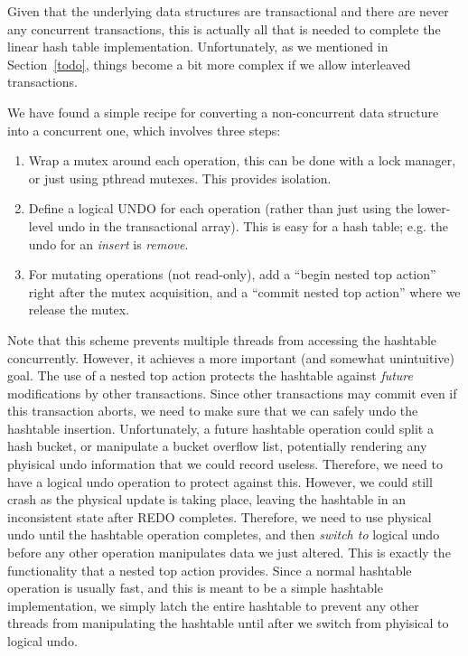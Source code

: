 \documentclass[letterpaper,twocolumn,english]{article}
\begin{document}
Given that the underlying data structures are transactional and there
are never any concurrent transactions, this is actually all that is
needed to complete the linear hash table implementation.
Unfortunately, as we mentioned in Section~\ref{todo}, things become a
bit more complex if we allow interleaved transactions. 

We have found a simple recipe for converting a non-concurrent data structure into a concurrent one, which involves three steps:
\begin{enumerate}
\item Wrap a mutex around each operation, this can be done with a lock
  manager, or just using pthread mutexes.  This provides isolation.
\item Define a logical UNDO for each operation (rather than just using
  the lower-level undo in the transactional array).  This is easy for a
  hash table; e.g. the undo for an {\em insert} is {\em remove}.
\item For mutating operations (not read-only), add a ``begin nested
  top action'' right after the mutex acquisition, and a ``commit
  nested top action'' where we release the mutex.
\end{enumerate}

Note that this scheme prevents multiple threads from accessing the
hashtable concurrently.  However, it achieves a more important (and
somewhat unintuitive) goal.  The use of a nested top action protects
the hashtable against {\em future} modifications by other
transactions.  Since other transactions may commit even if this
transaction aborts, we need to make sure that we can safely undo the
hashtable insertion.  Unfortunately, a future hashtable operation
could split a hash bucket, or manipulate a bucket overflow list,
potentially rendering any phyisical undo information that we could
record useless.  Therefore, we need to have a logical undo operation
to protect against this.  However, we could still crash as the
physical update is taking place, leaving the hashtable in an
inconsistent state after REDO completes.  Therefore, we need to use
physical undo until the hashtable operation completes, and then {\em
switch to} logical undo before any other operation manipulates data we
just altered.  This is exactly the functionality that a nested top
action provides.  Since a normal hashtable operation is usually fast,
and this is meant to be a simple hashtable implementation, we simply
latch the entire hashtable to prevent any other threads from
manipulating the hashtable until after we switch from phyisical to
logical undo.
\end{document}
